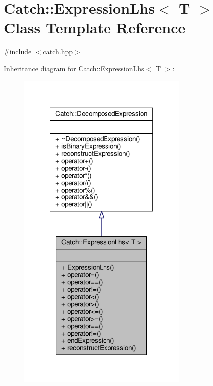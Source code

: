 \hypertarget{class_catch_1_1_expression_lhs}{\section{Catch\-:\-:Expression\-Lhs$<$ T $>$ Class Template Reference}
\label{class_catch_1_1_expression_lhs}
}


{\ttfamily \#include $<$catch.\-hpp$>$}



Inheritance diagram for Catch\-:\-:Expression\-Lhs$<$ T $>$\-:
\nopagebreak
\begin{figure}[H]
\begin{center}
\leavevmode
\includegraphics[width=234pt]{class_catch_1_1_expression_lhs__inherit__graph}
\end{center}
\end{figure}


